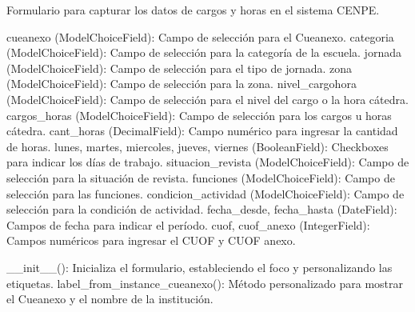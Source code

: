 \documentclass[letterpaper,10pt,spanish]{sphinxmanual}
\begin{document}
\begin{fulllineitems}

\pysigstartsignatures
{}
\pysigstopsignatures
\sphinxAtStartPar
Formulario para capturar los datos de cargos y horas en el sistema CENPE.
\begin{description}
\sphinxAtStartPar
cueanexo (ModelChoiceField): Campo de selección para el Cueanexo.
categoria (ModelChoiceField): Campo de selección para la categoría de la escuela.
jornada (ModelChoiceField): Campo de selección para el tipo de jornada.
zona (ModelChoiceField): Campo de selección para la zona.
nivel\_cargohora (ModelChoiceField): Campo de selección para el nivel del cargo o la hora cátedra.
cargos\_horas (ModelChoiceField): Campo de selección para los cargos u horas cátedra.
cant\_horas (DecimalField): Campo numérico para ingresar la cantidad de horas.
lunes, martes, miercoles, jueves, viernes (BooleanField): Checkboxes para indicar los días de trabajo.
situacion\_revista (ModelChoiceField): Campo de selección para la situación de revista.
funciones (ModelChoiceField): Campo de selección para las funciones.
condicion\_actividad (ModelChoiceField): Campo de selección para la condición de actividad.
fecha\_desde, fecha\_hasta (DateField): Campos de fecha para indicar el período.
cuof, cuof\_anexo (IntegerField): Campos numéricos para ingresar el CUOF y CUOF anexo.

\sphinxAtStartPar
\_\_init\_\_(): Inicializa el formulario, estableciendo el foco y personalizando las etiquetas.
label\_from\_instance\_cueanexo(): Método personalizado para mostrar el Cueanexo y el nombre de la institución.

\end{description}


\begin{fulllineitems}

\pysigstartsignatures
{}
\pysigstopsignatures

\begin{fulllineitems}

\pysigstartsignatures
{}
\pysigstopsignatures
\end{fulllineitems}




\end{fulllineitems}
\end{fulllineitems}
\end{document}

